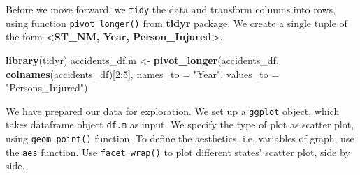 \documentclass[]{article}
\newenvironment{Shaded}{}{}
\newcommand{\DataTypeTok}[1]{\textcolor[rgb]{0.56,0.13,0.00}{#1}}
\newcommand{\DecValTok}[1]{\textcolor[rgb]{0.25,0.63,0.44}{#1}}
\newcommand{\KeywordTok}[1]{\textcolor[rgb]{0.00,0.44,0.13}{\textbf{#1}}}
\newcommand{\NormalTok}[1]{#1}
\newcommand{\OperatorTok}[1]{\textcolor[rgb]{0.40,0.40,0.40}{#1}}
\newcommand{\StringTok}[1]{\textcolor[rgb]{0.25,0.44,0.63}{#1}}
\begin{document}
Before we move forward, we \texttt{tidy} the data and transform columns
into rows, using function \texttt{pivot\_longer()} from \textbf{tidyr}
package. We create a single tuple of the form \textbf{\textless ST\_NM,
Year, Person\_Injured\textgreater{}}.

\begin{Shaded}
\begin{Highlighting}[]
\KeywordTok{library}\NormalTok{(tidyr)}
\NormalTok{accidents_df.m <-}\StringTok{ }\KeywordTok{pivot_longer}\NormalTok{(accidents_df, }\KeywordTok{colnames}\NormalTok{(accidents_df)[}\DecValTok{2}\OperatorTok{:}\DecValTok{5}\NormalTok{], }\DataTypeTok{names_to =} \StringTok{"Year"}\NormalTok{, }\DataTypeTok{values_to =} \StringTok{"Persons_Injured"}\NormalTok{)}
\end{Highlighting}
\end{Shaded}

We have prepared our data for exploration. We set up a \texttt{ggplot}
object, which takes dataframe object \texttt{df.m} as input. We specify
the type of plot as scatter plot, using \texttt{geom\_point()} function.
To define the aesthetics, i.e, variables of graph, use the \texttt{aes}
function. Use \texttt{facet\_wrap()} to plot different states' scatter
plot, side by side.

\begin{Shaded}
\end{Shaded}
\end{document}
